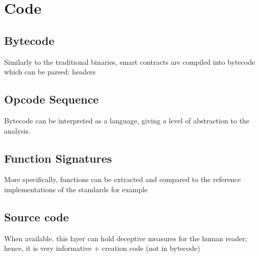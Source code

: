 \section{Code} \label{sec:static-code}

\subsection{Bytecode}

Similarly to the traditional binaries, smart contracts are compiled into bytecode which can be parsed: headers

\subsection{Opcode Sequence}

Bytecode can be interpreted as a language, giving a level of abstraction to the analysis.

\subsection{Function Signatures}

More specifically, functions can be extracted and compared to the reference implementations of the standards for example

\subsection{Source code}

When available, this layer can hold deceptive measures for the human reader; hence, it is very informative + creation code (not in bytecode)

